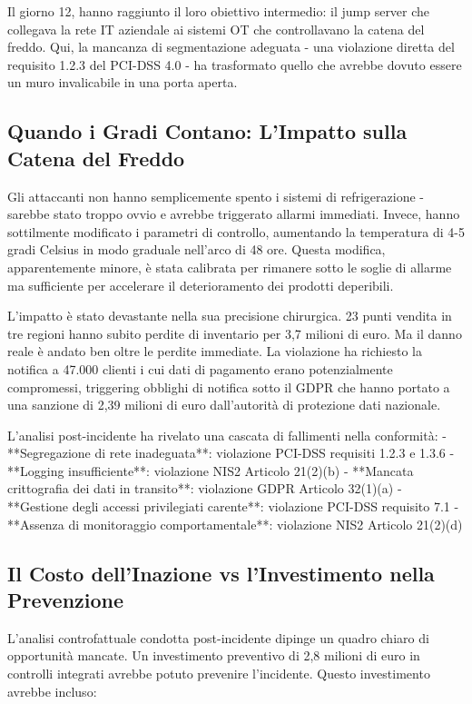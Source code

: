 Il giorno 12, hanno raggiunto il loro obiettivo intermedio: il jump server che collegava la rete IT aziendale ai sistemi OT che controllavano la catena del freddo. Qui, la mancanza di segmentazione adeguata - una violazione diretta del requisito 1.2.3 del PCI-DSS 4.0 - ha trasformato quello che avrebbe dovuto essere un muro invalicabile in una porta aperta.

\subsection{Quando i Gradi Contano: L'Impatto sulla Catena del Freddo}

Gli attaccanti non hanno semplicemente spento i sistemi di refrigerazione - sarebbe stato troppo ovvio e avrebbe triggerato allarmi immediati. Invece, hanno sottilmente modificato i parametri di controllo, aumentando la temperatura di 4-5 gradi Celsius in modo graduale nell'arco di 48 ore. Questa modifica, apparentemente minore, è stata calibrata per rimanere sotto le soglie di allarme ma sufficiente per accelerare il deterioramento dei prodotti deperibili.

L'impatto è stato devastante nella sua precisione chirurgica. 23 punti vendita in tre regioni hanno subito perdite di inventario per 3,7 milioni di euro. Ma il danno reale è andato ben oltre le perdite immediate. La violazione ha richiesto la notifica a 47.000 clienti i cui dati di pagamento erano potenzialmente compromessi, triggering obblighi di notifica sotto il GDPR che hanno portato a una sanzione di 2,39 milioni di euro dall'autorità di protezione dati nazionale.

L'analisi post-incidente ha rivelato una cascata di fallimenti nella conformità:
- **Segregazione di rete inadeguata**: violazione PCI-DSS requisiti 1.2.3 e 1.3.6
- **Logging insufficiente**: violazione NIS2 Articolo 21(2)(b)
- **Mancata crittografia dei dati in transito**: violazione GDPR Articolo 32(1)(a)
- **Gestione degli accessi privilegiati carente**: violazione PCI-DSS requisito 7.1
- **Assenza di monitoraggio comportamentale**: violazione NIS2 Articolo 21(2)(d)

\subsection{Il Costo dell'Inazione vs l'Investimento nella Prevenzione}

L'analisi controfattuale condotta post-incidente\autocite{Pearl2018} dipinge un quadro chiaro di opportunità mancate. Un investimento preventivo di 2,8 milioni di euro in controlli integrati avrebbe potuto prevenire l'incidente. Questo investimento avrebbe incluso:

